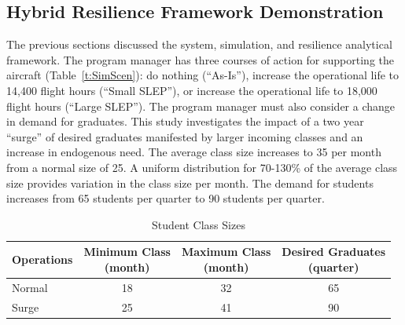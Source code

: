 \documentclass[preprint,12pt]{elsarticle}
\begin{document}
\subsection{Hybrid Resilience Framework Demonstration}

The previous sections discussed the system, simulation, and resilience
analytical framework. The program manager has three courses of action
for supporting the aircraft (Table~\ref{t:SimScen}): do nothing
(``As-Is''), increase the operational life to 14,400 flight hours
(``Small SLEP''), or increase the operational life to 18,000 flight
hours (``Large SLEP''). The program manager must also consider a
change in demand for graduates. This study investigates the impact of
a two year ``surge'' of desired graduates manifested by larger
incoming classes and an increase in endogenous need. The average class
size increases to 35 per month from a normal size of 25. A uniform
distribution for 70-130\% of the average class size 
provides variation in the class size per month. The demand
for students increases from 65 students per quarter to 90 students per
quarter. 

\begin{table}[h]
    \caption{SLEP Courses of Action}
    \label{t:SimScen}
  \begin{center}
    \end{center}
\end{table}

\begin{table}[h]
    \caption{Student Class Sizes}
  \label{t:StudScen}
    \begin{center}
    \begin{tabular}{l c c c}
      \hline
      \hline
      \textbf{Operations} & \makecell{\textbf{Minimum Class} \\ (month)} &
      \makecell{\textbf{Maximum Class} \\ (month)} & \makecell{\textbf{Desired Graduates} \\ (quarter)}\\
      \hline
      Normal  & 18 & 32 & 65\\
      Surge  & 25 & 41 & 90\\
      \hline
    \end{tabular}
    \end{center}
\end{table}
\end{document}
